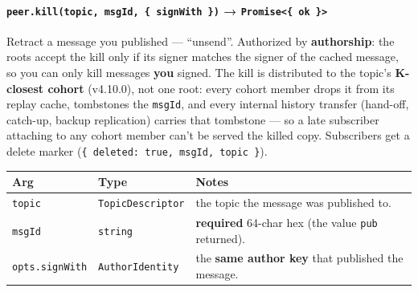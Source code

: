 \documentclass[
  nobib]{tufte-handout}
\newcounter{none} %
\begin{document}
\paragraph{\texorpdfstring{\texttt{peer.kill(topic,\ msgId,\ \{\ signWith\ \})}
→
\texttt{Promise\textless{}\{\ ok\ \}\textgreater{}}}{peer.kill(topic, msgId, \{ signWith \}) → Promise\textless\{ ok \}\textgreater{}}}\label{peer.killtopic-msgid-signwith-promise-ok}

Retract a message you published --- ``unsend''. Authorized by
\textbf{authorship}: the roots accept the kill only if its signer
matches the signer of the cached message, so you can only kill messages
\textbf{you} signed. The kill is distributed to the topic's
\textbf{K-closest cohort} (v4.10.0), not one root: every cohort member
drops it from its replay cache, tombstones the \texttt{msgId}, and every
internal history transfer (hand-off, catch-up, backup replication)
carries that tombstone --- so a late subscriber attaching to any cohort
member can't be served the killed copy. Subscribers get a delete marker
(\texttt{\{\ deleted:\ true,\ msgId,\ topic\ \}}).

{\def\LTcaptype{none} %
\begin{longtable}[]{@{}
  >{\raggedright\arraybackslash}p{}
  >{\raggedright\arraybackslash}p{}
  >{\raggedright\arraybackslash}p{}@{}}
\toprule\noalign{}
\begin{minipage}[b]{\linewidth}\raggedright
Arg
\end{minipage} & \begin{minipage}[b]{\linewidth}\raggedright
Type
\end{minipage} & \begin{minipage}[b]{\linewidth}\raggedright
Notes
\end{minipage} \\
\midrule\noalign{}
\endhead
\bottomrule\noalign{}
\endlastfoot
\texttt{topic} & \texttt{TopicDescriptor} & the topic the message was
published to. \\
\texttt{msgId} & \texttt{string} & \textbf{required} 64-char hex (the
value \texttt{pub} returned). \\
\texttt{opts.signWith} & \texttt{AuthorIdentity} & the \textbf{same
author key} that published the message. \\
\end{longtable}
}
\end{document}
